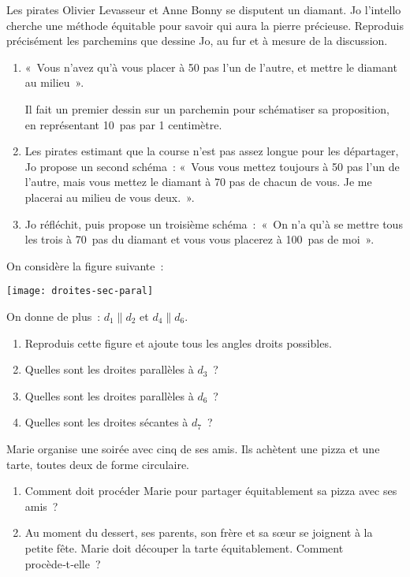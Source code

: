 
\begin{exercice}
Les pirates Olivier Levasseur et Anne Bonny se disputent un diamant. Jo l'intello cherche une méthode équitable pour savoir qui aura la pierre précieuse. Reproduis précisément les parchemins que dessine Jo, au fur et à mesure de la discussion.
\begin{enumerate}
 \item « Vous n'avez qu'à vous placer à 50 pas l'un de l'autre, et mettre le diamant au milieu ». 
 
Il fait un premier dessin sur un parchemin pour schématiser sa proposition, en représentant 10 pas par 1 centimètre.
 \item Les pirates estimant que la course n'est pas assez longue pour les départager, Jo propose un second schéma : « Vous vous mettez toujours à 50 pas l'un de l'autre, mais vous mettez le diamant à 70 pas de chacun de vous. Je me placerai au milieu de vous deux. ». \\[-0.9em]
 \item Jo réfléchit, puis propose un troisième schéma : « On n'a qu'à se mettre tous les trois à 70 pas du diamant et vous vous placerez à 100 pas de moi ».
 \end{enumerate}
\end{exercice} 


\begin{exercice}
On considère la figure suivante :
\begin{center} \texttt{[image: droites-sec-paral]} \end{center}
On donne de plus : $d_1 \parallel d_2$ et $d_4 \parallel d_6$.
 \begin{enumerate}
  \item Reproduis cette figure et ajoute tous les angles droits possibles.
  \item Quelles sont les droites parallèles à $d_3$ ?
  \item Quelles sont les droites parallèles à $d_6$ ?
  \item Quelles sont les droites sécantes à $d_7$ ?
  \end{enumerate}
\end{exercice}


\begin{exercice}
Marie organise une soirée avec cinq de ses amis. Ils achètent une pizza et une tarte, toutes deux de forme circulaire.
\begin{enumerate}
 \item Comment doit procéder Marie pour partager équitablement sa pizza avec ses amis ?
 \item Au moment du dessert, ses parents, son frère et sa sœur se joignent à la petite fête. Marie doit découper la tarte équitablement. Comment procède‑t‑elle ?
 \end{enumerate}
\end{exercice}


